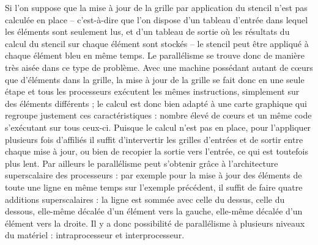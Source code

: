 Si l'on suppose que la mise à jour de la grille par application du stencil n'est pas calculée en place -- c'est-à-dire que l'on dispose d'un tableau d'entrée dans lequel les éléments sont seulement lus, et d'un tableau de sortie où les résultats du calcul du stencil sur chaque élément sont stockés -- le stencil peut être appliqué à chaque élément bleu en même temps. Le parallélisme se trouve donc de manière très aisée dans ce type de problème. Avec une  machine possédant autant de cœurs que d'éléments dans la grille, la mise à jour de la grille se fait donc en une seule étape et tous les processeurs exécutent les mêmes instructions, simplement sur des éléments différents ; le calcul est donc bien adapté à une carte graphique qui regroupe justement ces caractéristiques : nombre élevé de cœurs et un même code s'exécutant sur tous ceux-ci. Puisque le calcul n'est pas en place, pour l'appliquer plusieurs fois d'affiliés il suffit d'intervertir les grilles d'entrées et de sortir entre chaque mise à jour, ou bien de recopier la sortie vers l'entrée, ce qui est toutefois plus lent. Par ailleurs le parallélisme peut s'obtenir grâce à l'architecture superscalaire des processeurs : par exemple pour la mise à jour des éléments de toute une ligne en même temps sur l'exemple précédent, il suffit de faire quatre additions superscalaires : la ligne est sommée avec celle du dessus, celle du dessous, elle-même décalée d'un élément vers la gauche, elle-même décalée d'un élément vers la droite. Il y a donc possibilité de parallélisme à plusieurs niveaux du matériel : intraprocesseur et interprocesseur.

